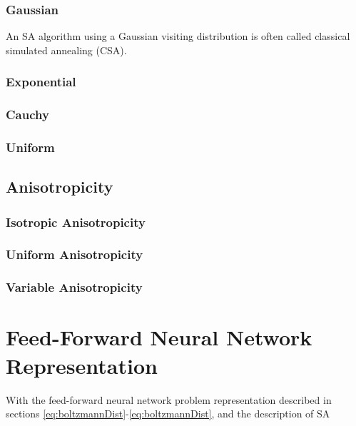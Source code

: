\documentclass[11pt]{afthesis}
\begin{document}
	
	\subsubsection{Gaussian}
	
	
	
	An SA algorithm using a Gaussian visiting distribution is often called classical simulated annealing (CSA).
	
	
	\subsubsection{Exponential}
	
	\subsubsection{Cauchy}
	
	\subsubsection{Uniform}
	
	\subsection{Anisotropicity}
	
	
	
	\subsubsection{Isotropic Anisotropicity}
	\subsubsection{Uniform Anisotropicity}
	\subsubsection{Variable Anisotropicity}
	
	
	
	\section{Feed-Forward Neural Network Representation}
	
	With the feed-forward neural network problem representation described in sections \ref{eq:boltzmannDist}-\ref{eq:boltzmannDist}, and the description of SA 
	
	
\end{document}
